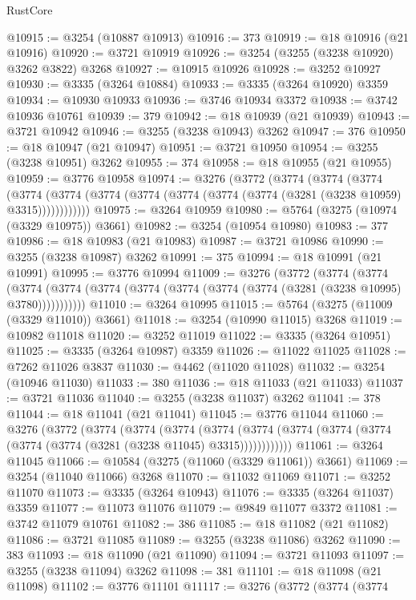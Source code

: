 \begin{lexlean}{RustCore}
\begin{coremodule}
@10915 := @3254 (@10887 @10913)
@10916 := 373
@10919 := @18 @10916 (@21 @10916)
@10920 := @3721 @10919
@10926 := @3254 (@3255 (@3238 @10920) @3262 @3822) @3268
@10927 := @10915 @10926
@10928 := @3252 @10927
@10930 := @3335 (@3264 @10884)
@10933 := @3335 (@3264 @10920) @3359
@10934 := @10930 @10933
@10936 := @3746 @10934 @3372
@10938 := @3742 @10936 @10761
@10939 := 379
@10942 := @18 @10939 (@21 @10939)
@10943 := @3721 @10942
@10946 := @3255 (@3238 @10943) @3262
@10947 := 376
@10950 := @18 @10947 (@21 @10947)
@10951 := @3721 @10950
@10954 := @3255 (@3238 @10951) @3262
@10955 := 374
@10958 := @18 @10955 (@21 @10955)
@10959 := @3776 @10958
@10974 := @3276
    (@3772
      (@3774
        (@3774
          (@3774
            (@3774 (@3774 (@3774 (@3774 (@3774 (@3774 (@3774 (@3281 (@3238 @10959) @3315))))))))))))
@10975 := @3264 @10959
@10980 := @5764 (@3275 (@10974 (@3329 @10975)) @3661)
@10982 := @3254 (@10954 @10980)
@10983 := 377
@10986 := @18 @10983 (@21 @10983)
@10987 := @3721 @10986
@10990 := @3255 (@3238 @10987) @3262
@10991 := 375
@10994 := @18 @10991 (@21 @10991)
@10995 := @3776 @10994
@11009 := @3276
    (@3772
      (@3774
        (@3774
          (@3774 (@3774 (@3774 (@3774 (@3774 (@3774 (@3774 (@3281 (@3238 @10995) @3780)))))))))))
@11010 := @3264 @10995
@11015 := @5764 (@3275 (@11009 (@3329 @11010)) @3661)
@11018 := @3254 (@10990 @11015) @3268
@11019 := @10982 @11018
@11020 := @3252 @11019
@11022 := @3335 (@3264 @10951)
@11025 := @3335 (@3264 @10987) @3359
@11026 := @11022 @11025
@11028 := @7262 @11026 @3837
@11030 := @4462 (@11020 @11028)
@11032 := @3254 (@10946 @11030)
@11033 := 380
@11036 := @18 @11033 (@21 @11033)
@11037 := @3721 @11036
@11040 := @3255 (@3238 @11037) @3262
@11041 := 378
@11044 := @18 @11041 (@21 @11041)
@11045 := @3776 @11044
@11060 := @3276
    (@3772
      (@3774
        (@3774
          (@3774
            (@3774 (@3774 (@3774 (@3774 (@3774 (@3774 (@3774 (@3281 (@3238 @11045) @3315))))))))))))
@11061 := @3264 @11045
@11066 := @10584 (@3275 (@11060 (@3329 @11061)) @3661)
@11069 := @3254 (@11040 @11066) @3268
@11070 := @11032 @11069
@11071 := @3252 @11070
@11073 := @3335 (@3264 @10943)
@11076 := @3335 (@3264 @11037) @3359
@11077 := @11073 @11076
@11079 := @9849 @11077 @3372
@11081 := @3742 @11079 @10761
@11082 := 386
@11085 := @18 @11082 (@21 @11082)
@11086 := @3721 @11085
@11089 := @3255 (@3238 @11086) @3262
@11090 := 383
@11093 := @18 @11090 (@21 @11090)
@11094 := @3721 @11093
@11097 := @3255 (@3238 @11094) @3262
@11098 := 381
@11101 := @18 @11098 (@21 @11098)
@11102 := @3776 @11101
@11117 := @3276
    (@3772
      (@3774
        (@3774

\end{coremodule}
\end{lexlean}
